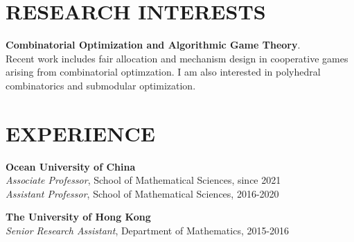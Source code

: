 \documentclass[margin]{res}
\begin{document}


\address{}


\begin{resume}

\section{RESEARCH INTERESTS}
\textbf{Combinatorial Optimization and Algorithmic Game Theory}. \\
Recent work includes fair allocation and mechanism design in cooperative games arising from combinatorial optimzation. I am also interested in polyhedral combinatorics and submodular optimization.

\section{EXPERIENCE}
\textbf{Ocean University of China}\\
{\sl Associate Professor}, School of Mathematical Sciences, since 2021
\\
{\sl Assistant Professor}, School of Mathematical Sciences, 2016-2020

\textbf{The University of Hong Kong}\\
{\sl Senior Research Assistant}, Department of Mathematics, 2015-2016


\end{resume}
\end{document}
